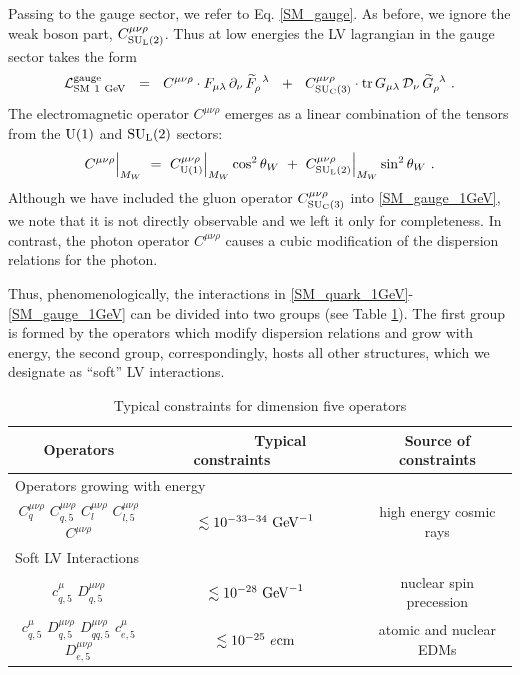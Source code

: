 \documentclass[12pt]{revtex4}
\newcommand{\wt}{\widetilde}
\newcommand{\suc}{{\rm SU}_{\rm C}(3)}
\newcommand{\sul}{{\rm SU}_{\rm L}(2)}
\newcommand{\ue}{{\rm U}(1)}
\begin{document}
	Passing to the gauge sector, we refer to Eq. \eqref{SM_gauge}.
	As before, we ignore the weak boson part, $ C_{\sul}^{\mu\nu\rho} $.
	Thus at low energies the LV lagrangian in the gauge sector
	takes the form
\begin{equation}
\label{SM_gauge_1GeV}
	\mathcal{L}_{\rm SM\ 1~GeV}^{\rm gauge} ~~=~~
	C^{\mu\nu\rho} \cdot 
	F_{\mu\lambda}\, \partial_\nu\, \wt{F}_\rho^{\phantom{\rho}\lambda}
	~~+~~
	C_{\suc}^{\mu\nu\rho} \cdot 
	{\rm tr}\,
	G_{\mu\lambda}\, \mathcal{D}_\nu\, \wt{G}_\rho^{\phantom{\rho}\lambda}
	~.
\end{equation}
	The electromagnetic operator
$ C^{\mu\nu\rho} $
	emerges as a linear combination of the tensors from the $ \ue $ 
	and $ \sul $ sectors:
\[
	C^{\mu\nu\rho}\Bigr|_{M_W} ~=~ 
		C^{\mu\nu\rho}_{\ue}\Bigr|_{M_W} \cos^2 \theta_W ~+~ 
		C^{\mu\nu\rho}_{\sul}\Bigr|_{M_W} \sin^2 \theta_W~.
\]
	Although we have included the gluon operator $ C_{\suc}^{\mu\nu\rho} $
	into \eqref{SM_gauge_1GeV}, we note 
	that it is not directly observable and we left it only for completeness.
	In contrast, the photon operator $ C^{\mu\nu\rho} $ causes a
	cubic modification of the dispersion relations for the photon.


	Thus, phenomenologically, the interactions in \eqref{SM_quark_1GeV}-\eqref{SM_gauge_1GeV} 
	can be divided into two groups (see Table \ref{constr_table}).
	The first group is formed by the operators which modify dispersion relations
	and grow with energy, the second group, correspondingly, hosts all other
	structures, which we designate as ``soft'' LV interactions.

\begin{table}[tb]
\label{constr_table}
\caption{Typical constraints for dimension five operators}
\begin{tabular}{|ccc|}
\hline
	\multicolumn{1}{|c|}{Operators} & 
	\multicolumn{1}{|c|}{~~~~~~Typical constraints~~~~~~} & 
	\multicolumn{1}{|c|}{Source of constraints} \\
\hline
	\multicolumn{3}{|l|}{\quad Operators growing with energy} \\
\hline
	$ C_{q}^{\mu\nu\rho} $ $ C_{q,5}^{\mu\nu\rho} $
	$ C_l^{\mu\nu\rho} $  $ C_{l,5}^{\mu\nu\rho} $
	$ C^{\mu\nu\rho} $ &
	$ \lesssim 10^{-33-34}~{\rm GeV}^{-1} $
	&
	high energy cosmic rays
	\\
\hline
	\multicolumn{3}{|l|}{\quad Soft LV Interactions} \\
\hline
	$ c^\mu_{q,5} $ $ D^{\mu\nu\rho}_{q,5} $ &
	$ \lesssim 10^{-28}~{\rm GeV}^{-1} $     &
	nuclear spin precession \\
\hline
	$ c^\mu_{q,5} $ $ D^{\mu\nu\rho}_{q,5} $ 
	$ D^{\mu\nu\rho}_{qq,5} $ 
	$ c^\mu_{e,5} $ $ D^{\mu\nu\rho}_{e,5} $ &
	$ \lesssim 10^{-25}~e{\rm cm} $          &
	atomic and nuclear EDMs \\
\hline
\end{tabular}
\end{table}
	
\end{document}
